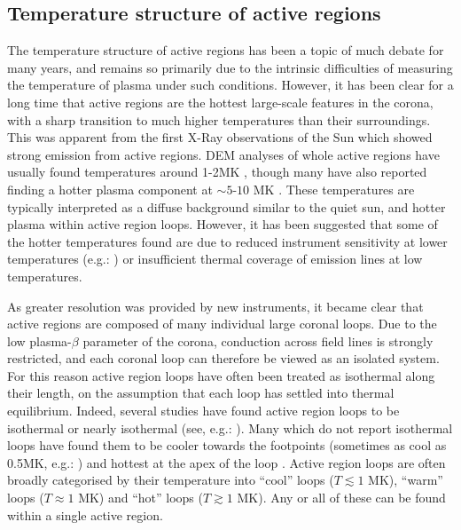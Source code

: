 \documentclass[namedreferences]{solarphysics}
\begin{document}
\begin{article}
\subsection{Temperature structure of active regions}
The temperature structure of active regions has been a topic of much debate for many years, and remains so primarily due to the intrinsic difficulties of measuring the temperature of plasma under such conditions.
However, it has been clear for a long time that active regions are the hottest large-scale features in the corona, with a sharp transition to much higher temperatures than their surroundings.
This was apparent from the first X-Ray observations of the Sun which showed strong emission from active regions.
DEM analyses of whole active regions have usually found temperatures around 1-2MK \citep{Brosius1996,Kashyap1998,Schmelz2009,Reale2009,Warren2009a,Goryaev2010}, though many have also reported finding a hotter plasma component at $\sim 5$-$10$ MK \citep{Brosius1996,Kashyap1998,Schmelz2009,Reale2009}.
These temperatures are typically interpreted as a diffuse background similar to the quiet sun, and hotter plasma within active region loops.
However, it has been suggested that some of the hotter temperatures found are due to reduced instrument sensitivity at lower temperatures (e.g.: \citet{Boerner2013}) or insufficient thermal coverage of emission lines at low temperatures.

As greater resolution was provided by new instruments, it became clear that active regions are composed of many individual large coronal loops.
Due to the low plasma-$\beta$ parameter of the corona, conduction across field lines is strongly restricted, and each coronal loop can therefore be viewed as an isolated system.
For this reason active region loops have often been treated as isothermal along their length, on the assumption that each loop has settled into thermal equilibrium.
Indeed, several studies have found active region loops to be isothermal or nearly isothermal (see, e.g.: \citet{Lenz1999,DelZanna2011,DelZanna2013}).
Many which do not report isothermal loops have found them to be cooler towards the footpoints (sometimes as cool as 0.5MK, e.g.: \citet{DelZanna2011}) and hottest at the apex of the loop \citep{Cheng1980,Aschwanden2000,DelZanna2003}.
Active region loops are often broadly categorised by their temperature into ``cool'' loops ($T\lesssim 1$ MK), ``warm'' loops ($T\approx 1$ MK) and ``hot'' loops ($T\gtrsim 1$ MK).
Any or all of these can be found within a single active region.


\end{article}
\end{document}
